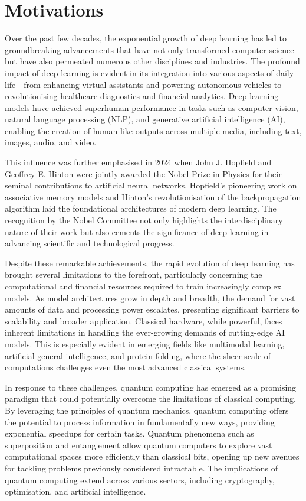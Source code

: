 \section{Motivations}
\label{sec:motivations}
Over the past few decades, the exponential growth of deep learning
has led to groundbreaking advancements that have not only transformed
computer science but have also permeated numerous other disciplines
and industries. The profound impact of deep learning is evident in
its integration into various aspects of daily life—from enhancing
virtual assistants and powering autonomous vehicles to
revolutionising healthcare diagnostics and financial analytics. Deep
learning models have achieved superhuman performance in tasks such as
computer vision, natural language processing (NLP), and generative
artificial intelligence (AI), enabling the creation of human-like
outputs across multiple media, including text, images, audio, and video.

This influence was further emphasised in 2024 when John J. Hopfield
and Geoffrey E. Hinton were jointly awarded the Nobel Prize in
Physics for their seminal contributions to artificial neural
networks. Hopfield's pioneering work on associative memory models and
Hinton's revolutionisation of the backpropagation algorithm laid the
foundational architectures of modern deep learning. The recognition
by the Nobel Committee not only highlights the interdisciplinary
nature of their work but also cements the significance of deep
learning in advancing scientific and technological progress.

Despite these remarkable achievements, the rapid evolution of deep
learning has brought several limitations to the forefront,
particularly concerning the computational and financial resources
required to train increasingly complex models. As model architectures
grow in depth and breadth, the demand for vast amounts of data and
processing power escalates, presenting significant barriers to
scalability and broader application. Classical hardware, while
powerful, faces inherent limitations in handling the ever-growing
demands of cutting-edge AI models. This is especially evident in
emerging fields like multimodal learning, artificial general
intelligence, and protein folding, where the sheer scale of
computations challenges even the most advanced classical systems.

In response to these challenges, quantum computing has emerged as a
promising paradigm that could potentially overcome the limitations of
classical computing. By leveraging the principles of quantum
mechanics, quantum computing offers the potential to process
information in fundamentally new ways, providing exponential speedups
for certain tasks. Quantum phenomena such as superposition and
entanglement allow quantum computers to explore vast computational
spaces more efficiently than classical bits, opening up new avenues
for tackling problems previously considered intractable. The
implications of quantum computing extend across various sectors,
including cryptography, optimisation, and artificial intelligence.

